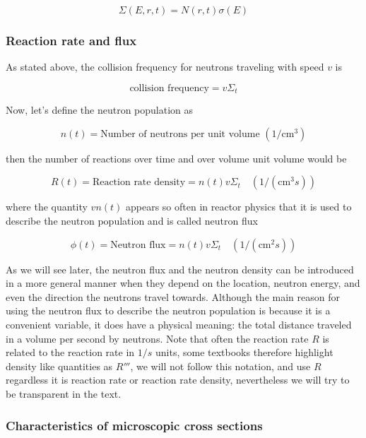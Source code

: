 \[
\Sigma (E, r, t)=N(r,t)\sigma (E)
\]

\subsubsection{Reaction rate and flux}

As stated above, the collision frequency for neutrons traveling with speed $v$ is 

\begin{equation}
\text{collision frequency}=v\Sigma_t
\end{equation}

\noindent Now, let's define the neutron population as 

\begin{equation}
n(t)=\text{Number of neutrons per unit volume }(1/\text{cm}^3)
\end{equation}

\noindent then the number of reactions over time and over volume unit volume would be

\begin{equation}
R(t)=\text{Reaction rate density}=n(t)v\Sigma_t \quad (1/(\text{cm}^3s))
\end{equation}

\noindent where the quantity $vn(t)$ appears so often in reactor physics that it is used to describe the neutron population and is called neutron flux

\begin{equation}
\phi(t)=\text{Neutron flux}=n(t)v\Sigma_t \quad (1/(\text{cm}^2s))
\end{equation}

As we will see later, the neutron flux and the neutron density can be introduced in a more general manner when they depend on the location, neutron energy, and even the direction the neutrons travel towards. Although the main reason for using the neutron flux to describe the neutron population is because it is a convenient variable, it does have a physical meaning: the total distance traveled in a volume per second by neutrons. Note that often the reaction rate $R$ is related to the reaction rate in $1/s$ units, some textbooks therefore highlight density like quantities as $R'''$, we will not follow this notation, and use $R$ regardless it is reaction rate or reaction rate density, nevertheless we will try to be transparent in the text.


\subsubsection{Characteristics of microscopic cross sections}

